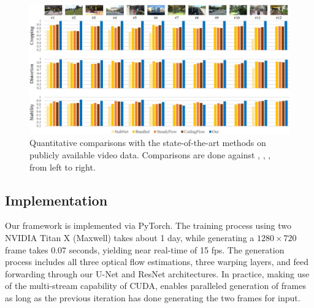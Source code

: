 \begin{figure}
	\includegraphics[width=1\linewidth,keepaspectratio]{quant}
	\vspace{-5mm}
	\caption{Quantitative comparisons with the state-of-the-art methods on publicly available video data.
	Comparisons are done against \cite{wang2018deep}, \cite{liu2013bundled}, \cite{liu2014steadyflow}, \cite{liu2017codingflow} from left to right.}
	\label{quant}
	\vspace{-2mm}
\end{figure}

\subsection{Implementation}
Our framework is implemented via PyTorch.
The training process using two NVIDIA Titan X (Maxwell) takes about 1 day, while generating a $1280\times720$ frame takes 0.07 seconds, yielding near real-time of 15 fps.
The generation process includes all three optical flow estimations, three warping layers, and feed forwarding through our U-Net and ResNet architectures.
In practice, making use of the multi-stream capability of CUDA, enables paralleled generation of frames as long as the previous iteration has done generating the two frames for input.

